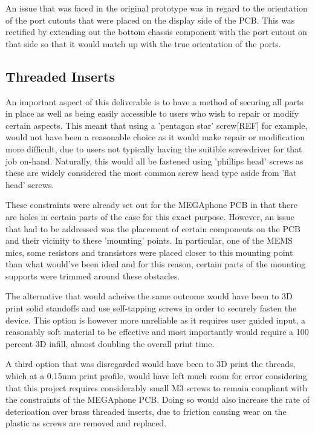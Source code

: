 An issue that was faced in the original prototype was in regard to the orientation of the port cutouts that were placed on the display side of the PCB.
This was rectified by extending out the bottom chassis component with the port cutout on that side so that it would match up with the true orientation of the ports. %

\subsection{Threaded Inserts}

An important aspect of this deliverable is to have a method of securing all parts in place as well as being easily accessible to users who wish to repair or modify certain aspects.
This meant that using a 'pentagon star' screw[REF] for example, would not have been a reasonable choice as it would make repair or modification more difficult, due to users not typically having the suitible screwdriver for that job on-hand.
Naturally, this would all be fastened using 'phillips head' screws as these are widely considered the most common screw head type aside from 'flat head' screws.

These constraints were already set out for the MEGAphone PCB in that there are holes in certain parts of the case for this exact purpose.
However, an issue that had to be addressed was the placement of certain components on the PCB and their vicinity to these 'mounting' points.
In particular, one of the MEMS mics, some resistors and transistors were placed closer to this mounting point than what would've been ideal and for this reason, certain parts of the mounting supports were trimmed around these obstacles.

The alternative that would acheive the same outcome would have been to 3D print solid standoffs and use self-tapping screws in order to securely fasten the device.
This option is however more unreliable as it requires user guided input, a reasonably soft material to be effective and most importantly would require a 100 percent 3D infill, almost doubling the overall print time.

A third option that was disregarded would have been to 3D print the threads, which at a 0.15mm print profile, would have left much room for error considering that this project requires considerably small M3 screws to remain compliant with the constraints of the MEGAphone PCB.
Doing so would also increase the rate of deterioation over brass threaded inserts, due to friction causing wear on the plastic as screws are removed and replaced.

